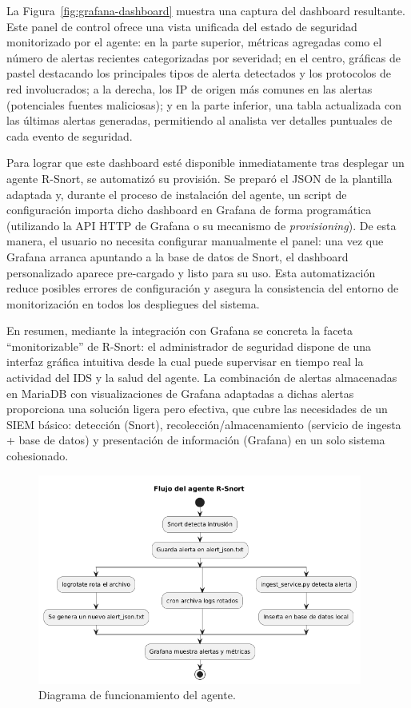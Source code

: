 \documentclass[11pt,a4paper,twoside]{report}
\begin{document}
La Figura~\ref{fig:grafana-dashboard} muestra una captura del dashboard resultante. Este panel de control ofrece una vista unificada del estado de seguridad monitorizado por el agente: en la parte superior, métricas agregadas como el número de alertas recientes categorizadas por severidad; en el centro, gráficas de pastel destacando los principales tipos de alerta detectados y los protocolos de red involucrados; a la derecha, los IP de origen más comunes en las alertas (potenciales fuentes maliciosas); y en la parte inferior, una tabla actualizada con las últimas alertas generadas, permitiendo al analista ver detalles puntuales de cada evento de seguridad.\newline

Para lograr que este dashboard esté disponible inmediatamente tras desplegar un agente R-Snort, se automatizó su provisión. Se preparó el JSON de la plantilla adaptada y, durante el proceso de instalación del agente, un script de configuración importa dicho dashboard en Grafana de forma programática (utilizando la API HTTP de Grafana o su mecanismo de \textit{provisioning}). De esta manera, el usuario no necesita configurar manualmente el panel: una vez que Grafana arranca apuntando a la base de datos de Snort, el dashboard personalizado aparece pre-cargado y listo para su uso. Esta automatización reduce posibles errores de configuración y asegura la consistencia del entorno de monitorización en todos los despliegues del sistema.\newline

En resumen, mediante la integración con Grafana se concreta la faceta “monitorizable” de R-Snort: el administrador de seguridad dispone de una interfaz gráfica intuitiva desde la cual puede supervisar en tiempo real la actividad del IDS y la salud del agente. La combinación de alertas almacenadas en MariaDB con visualizaciones de Grafana adaptadas a dichas alertas proporciona una solución ligera pero efectiva, que cubre las necesidades de un SIEM básico: detección (Snort), recolección/almacenamiento (servicio de ingesta + base de datos) y presentación de información (Grafana) en un solo sistema cohesionado.

\begin{figure}[htb]
	\centering
	\includegraphics[width=0.95\textwidth]{documento/11.png}
	\caption{Diagrama de funcionamiento del agente.}
	\label{fig:agent-bpmn}
\end{figure}
\end{document}
